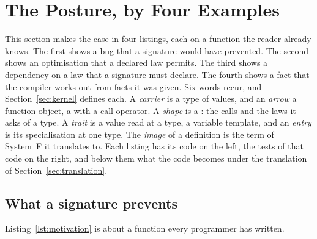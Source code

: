 \section{The Posture, by Four Examples}
\label{sec:examples}

This section makes the case in four listings, each on a function the reader already knows.
The first shows a bug that a signature would have prevented.
The second shows an optimisation that a declared law permits.
The third shows a dependency on a law that a signature must declare.
The fourth shows a fact that the compiler works out from facts it was given.
Six words recur, and Section~\ref{sec:kernel} defines each.
A \emph{carrier} is a type of values, and an \emph{arrow} a function object, a  with a call operator.
A \emph{shape} is a : the calls and the laws it asks of a type.
A \emph{trait} is a value read at a type, a variable template, and an \emph{entry} is its specialisation at one type.
The \emph{image} of a definition is the term of System~F it translates to.
Each listing has its code on the left, the tests of that code on the right, and below them what the code becomes under the translation of Section~\ref{sec:translation}.

\subsection{What a signature prevents}
\label{sec:examples:signature}

Listing~\ref{lst:motivation} is about a function every \Cpp{} programmer has written.

